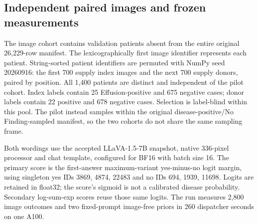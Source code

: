 \begin{table}[H]
\centering
\caption{Paired text-margin changes across description patterns.}
\label{tab:text-pairs}
\end{table}

\subsection{Independent paired images and frozen measurements}

The image cohort contains validation patients absent from the entire
original 26,229-row manifest. The lexicographically first image identifier
represents each patient. String-sorted patient identifiers are permuted
with NumPy seed 20260916: the first 700 supply index images and the next
700 supply donors, paired by position. All 1,400 patients are distinct and
independent of the pilot cohort. Index labels contain 25 Effusion-positive
and 675 negative cases; donor labels contain 22 positive and 678 negative
cases. Selection is label-blind within this pool. The pilot instead samples
within the original disease-positive/No Finding-sampled manifest, so the
two cohorts do not share the same sampling frame.

Both wordings use the accepted LLaVA-1.5-7B snapshot, native 336-pixel
processor and chat template, configured for BF16 with batch size 16.
The primary score is the first-answer maximum-variant yes-minus-no logit
margin, using singleton yes IDs 3869, 4874, 22483 and no IDs 694, 1939,
11698. Logits are retained in float32; the score's sigmoid is not a
calibrated disease probability. Secondary log-sum-exp scores reuse those
same logits. The run measures 2,800 image outcomes and two fixed-prompt
image-free priors in 260 dispatcher seconds on one A100.

